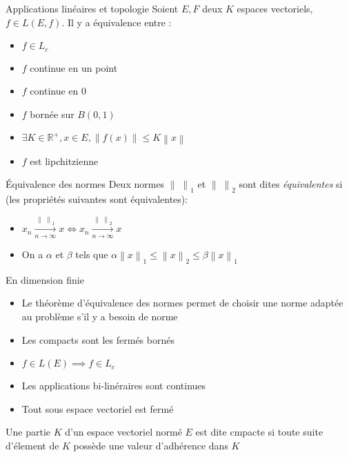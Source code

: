 \documentclass[french, a4paper, 11pt, twocolumn]{article}
\newcommand{\norme}[1]{\left\| #1\right\|}
\newcommand{\R}{\mathbb{R}}   %
\begin{document}
\begin{theoreme}{Applications linéaires et topologie}
    Soient $E,F$ deux $K$ espaces vectoriels, $f \in L(E,f)$. Il y a équivalence entre :
    \begin{itemize}[label=$\bullet$]
        \item $f \in L_c$
        \item $f$ continue en un point
        \item $f$ continue en $0$
        \item $f$ bornée sur $B(0,1)$
        \item $\exists K \in \R^+, x\in E, \norme{f(x)}\leq K\norme{x}$
        \item $f$ est lipchitzienne
    \end{itemize}
\end{theoreme}

\begin{theoreme}{Équivalence des normes}
  Deux normes $\norme{\;}_{1}$ et $\norme{\;}_{2}$ sont dites \emph{équivalentes} si (les propriétés suivantes sont équivalentes):
  \begin{itemize}[label=$\bullet$]
    \item $x_{n} \xrightarrow[n\rightarrow \infty]{\norme{\;}_{1}} x \iff x_{n} \xrightarrow[n\rightarrow \infty]{\norme{\;}_{2}}x$
    \item On a $\alpha$ et $\beta$ tels que $\alpha\norme{x}_{1}\leqslant\norme{x}_{2}\leqslant\beta\norme{x}_{1}$
  \end{itemize}
\end{theoreme}

\begin{theoreme}{En dimension finie}
    \begin{itemize}[label=$\bullet$]
        \item Le théorème d'équivalence des normes permet de choisir une norme adaptée au problème s'il y a besoin de norme
        \item Les compacts sont les fermés bornés
        \item $f \in L(E) \implies f \in L_c$
        \item Les applications bi-linéraires sont continues
        \item Tout sous espace vectoriel est fermé
    \end{itemize}
\end{theoreme}

\begin{definition}
    Une partie $K$ d'un espace vectoriel normé $E$ est dite cmpacte si toute suite d'élement de $K$ possède une valeur d’adhérence dans $K$
\end{definition}
\end{document}
